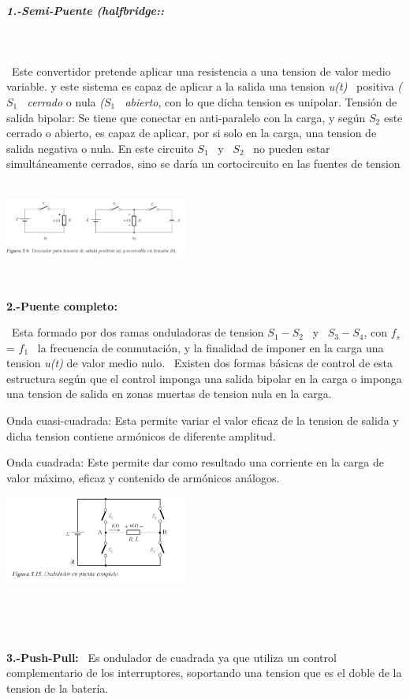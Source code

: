 \documentclass[12pt,letterpaper]{article}
\begin{document}
\ 

\subparagraph{ 1.-Semi-Puente (halfbridge::}
\

\
Este convertidor pretende aplicar una resistencia a una tension de valor medio variable. y este sistema es capaz de aplicar a la salida una tension \textit{u(t)} \ positiva \textit{($S_1$ \ cerrado} o nula \textit{($S_1$ \ abierto}, con lo que dicha tension es unipolar.
Tensión de salida bipolar: Se tiene que conectar en anti-paralelo con la carga, y según $S_2$ este cerrado o abierto, es capaz de aplicar, por si solo en la carga, una tension de salida negativa o nula.
En este circuito $S_1$ \ y \ $S_2$ \ no pueden estar simultáneamente cerrados, sino se daría un cortocircuito en las fuentes de tension
\
\

\includegraphics[width=6cm]{Semi-puente.png} 
\

\

\textbf{2.-Puente completo:}
\

\
Esta formado por dos ramas onduladoras de tension $S_1-S_2$ \ y \ $S_3-S_4$, con $f_s$ = $f_1$ \ la frecuencia de conmutación, y la finalidad de imponer en la carga una tension \textit{u(t)} de valor medio nulo.
\
Existen dos formas básicas de control de esta estructura según que el control imponga una salida bipolar en la carga o imponga una tension de salida en zonas muertas de tension nula en la carga.
\

Onda cuasi-cuadrada: Esta permite variar el valor eficaz de la tension de salida y dicha tension contiene armónicos de diferente amplitud.
\

Onda cuadrada:  Este permite dar como resultado una corriente en la carga de valor máximo, eficaz y contenido de armónicos análogos.
\

\includegraphics[width=6cm]{Puente completo.png} 

\


\

\textbf{3.-Push-Pull:}
\
Es ondulador de cuadrada ya que utiliza un control complementario de los interruptores, soportando una tension que es el doble de la tension de la batería.
\end{document}
